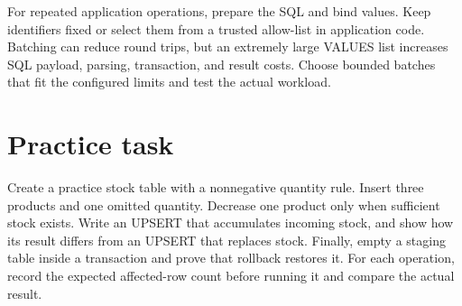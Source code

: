 For repeated application operations, prepare the SQL and bind values. Keep identifiers fixed or select them from a trusted allow-list in application code. Batching can reduce round trips, but an extremely large VALUES list increases SQL payload, parsing, transaction, and result costs. Choose bounded batches that fit the configured limits and test the actual workload.

\section{Practice task}

Create a practice stock table with a nonnegative quantity rule. Insert three products and one omitted quantity. Decrease one product only when sufficient stock exists. Write an UPSERT that accumulates incoming stock, and show how its result differs from an UPSERT that replaces stock. Finally, empty a staging table inside a transaction and prove that rollback restores it. For each operation, record the expected affected-row count before running it and compare the actual result.
